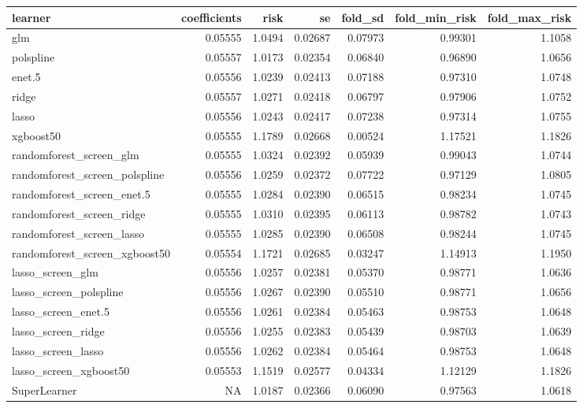 \documentclass[12pt, krantz2,]{krantz}
\theoremstyle{definition}
\theoremstyle{definition}
\theoremstyle{definition}
\newcommand{\1}{\mathbbm{1}}
\begin{document}
\begin{tabular}{l|r|r|r|r|r|r}
\hline
learner & coefficients & risk & se & fold\_sd & fold\_min\_risk & fold\_max\_risk\\
\hline
glm & 0.05555 & 1.0494 & 0.02687 & 0.07973 & 0.99301 & 1.1058\\
\hline
polspline & 0.05557 & 1.0173 & 0.02354 & 0.06840 & 0.96890 & 1.0656\\
\hline
enet.5 & 0.05556 & 1.0239 & 0.02413 & 0.07188 & 0.97310 & 1.0748\\
\hline
ridge & 0.05557 & 1.0271 & 0.02418 & 0.06797 & 0.97906 & 1.0752\\
\hline
lasso & 0.05556 & 1.0243 & 0.02417 & 0.07238 & 0.97314 & 1.0755\\
\hline
xgboost50 & 0.05555 & 1.1789 & 0.02668 & 0.00524 & 1.17521 & 1.1826\\
\hline
randomforest\_screen\_glm & 0.05555 & 1.0324 & 0.02392 & 0.05939 & 0.99043 & 1.0744\\
\hline
randomforest\_screen\_polspline & 0.05556 & 1.0259 & 0.02372 & 0.07722 & 0.97129 & 1.0805\\
\hline
randomforest\_screen\_enet.5 & 0.05555 & 1.0284 & 0.02390 & 0.06515 & 0.98234 & 1.0745\\
\hline
randomforest\_screen\_ridge & 0.05555 & 1.0310 & 0.02395 & 0.06113 & 0.98782 & 1.0743\\
\hline
randomforest\_screen\_lasso & 0.05555 & 1.0285 & 0.02390 & 0.06508 & 0.98244 & 1.0745\\
\hline
randomforest\_screen\_xgboost50 & 0.05554 & 1.1721 & 0.02685 & 0.03247 & 1.14913 & 1.1950\\
\hline
lasso\_screen\_glm & 0.05556 & 1.0257 & 0.02381 & 0.05370 & 0.98771 & 1.0636\\
\hline
lasso\_screen\_polspline & 0.05556 & 1.0267 & 0.02390 & 0.05510 & 0.98771 & 1.0656\\
\hline
lasso\_screen\_enet.5 & 0.05556 & 1.0261 & 0.02384 & 0.05463 & 0.98753 & 1.0648\\
\hline
lasso\_screen\_ridge & 0.05556 & 1.0255 & 0.02383 & 0.05439 & 0.98703 & 1.0639\\
\hline
lasso\_screen\_lasso & 0.05556 & 1.0262 & 0.02384 & 0.05464 & 0.98753 & 1.0648\\
\hline
lasso\_screen\_xgboost50 & 0.05553 & 1.1519 & 0.02577 & 0.04334 & 1.12129 & 1.1826\\
\hline
SuperLearner & NA & 1.0187 & 0.02366 & 0.06090 & 0.97563 & 1.0618\\
\hline
\end{tabular}
\end{document}
